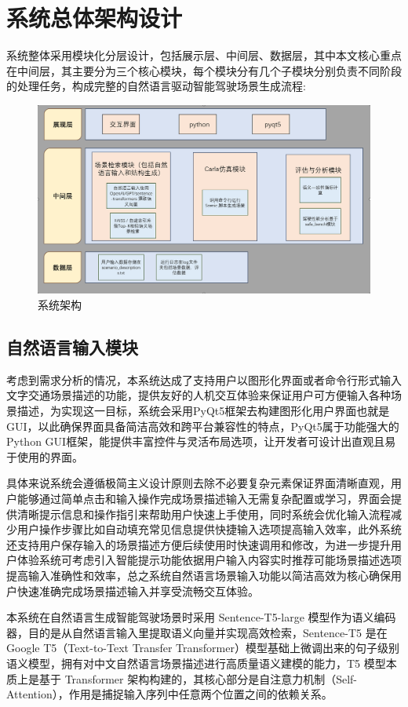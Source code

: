 \section{系统总体架构设计}
系统整体采用模块化分层设计，包括展示层、中间层、数据层，其中本文核心重点在中间层，其主要分为三个核心模块，每个模块分有几个子模块分别负责不同阶段的处理任务，构成完整的自然语言驱动智能驾驶场景生成流程:
\begin{figure}[H]
	\centering
	\includegraphics[width=1.0\textwidth]{images/系统架构图1.png}
	\caption{系统架构}
	\label{fig:system-architecture}
\end{figure}
\subsection{自然语言输入模块}
考虑到需求分析的情况，本系统达成了支持用户以图形化界面或者命令行形式输入文字交通场景描述的功能，提供友好的人机交互体验来保证用户可方便输入各种场景描述，为实现这一目标，系统会采用PyQt5框架去构建图形化用户界面也就是GUI，以此确保界面具备简洁高效和跨平台兼容性的特点，PyQt5属于功能强大的Python GUI框架，能提供丰富控件与灵活布局选项，让开发者可设计出直观且易于使用的界面。

具体来说系统会遵循极简主义设计原则去除不必要复杂元素保证界面清晰直观，用户能够通过简单点击和输入操作完成场景描述输入无需复杂配置或学习，界面会提供清晰提示信息和操作指引来帮助用户快速上手使用，同时系统会优化输入流程减少用户操作步骤比如自动填充常见信息提供快捷输入选项提高输入效率，此外系统还支持用户保存输入的场景描述方便后续使用时快速调用和修改，为进一步提升用户体验系统可考虑引入智能提示功能依据用户输入内容实时推荐可能场景描述选项提高输入准确性和效率，总之系统自然语言场景输入功能以简洁高效为核心确保用户快速准确完成场景描述输入并享受流畅交互体验。

本系统在自然语言生成智能驾驶场景时采用 Sentence-T5-large 模型作为语义编码器，目的是从自然语言输入里提取语义向量并实现高效检索，Sentence-T5 是在 Google T5（Text-to-Text Transfer Transformer）模型基础上微调出来的句子级别语义模型，拥有对中文自然语言场景描述进行高质量语义建模的能力，T5 模型本质上是基于 Transformer 架构构建的，其核心部分是自注意力机制（Self-Attention），作用是捕捉输入序列中任意两个位置之间的依赖关系。

